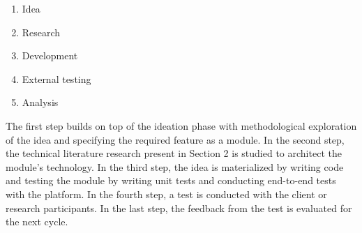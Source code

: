 \documentclass{article}
\begin{document}
\begin{enumerate}
	\item Idea
	\item Research
	\item Development
	\item External testing
	\item Analysis
\end{enumerate}

The first step builds on top of the ideation phase with methodological exploration of the idea and specifying the required feature as a module. In the second step, the technical literature research present in Section 2 is studied to architect the module's technology. In the third step, the idea is materialized by writing code and testing the module by writing unit tests and conducting end-to-end tests with the platform. In the fourth step, a test is conducted with the client or research participants. In the last step, the feedback from the test is evaluated for the next cycle.
\end{document}
